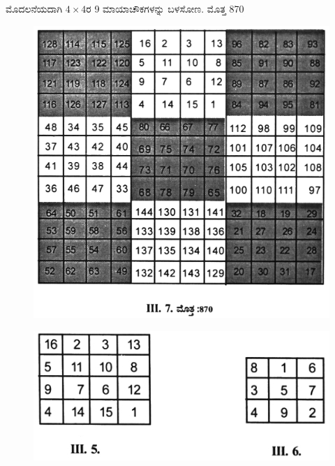 ಮೊದಲನೆಯದಾಗಿ $4 \times 4$ರ 9 ಮಾಯಾಚೌಕಗಳನ್ನು ಬಳಸೋಣ. ಮೊತ್ತ 870
\begin{figure}[H]
\includegraphics[scale=.8]{src/figures/chap3/fig3.33.jpg}
\end{figure}

\begin{figure}[H]
\includegraphics[scale=.8]{src/figures/chap3/fig3.34.jpg}
\end{figure}

